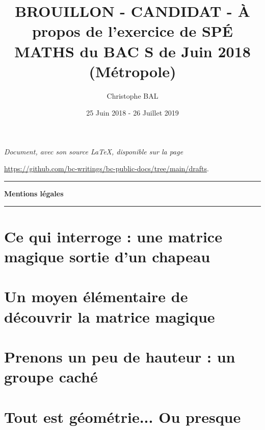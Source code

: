 \documentclass[12pt]{amsart}
\newcommand\squote[1]{\og #1 \fg{}}
\begin{document}
\title{BROUILLON - CANDIDAT - À propos de l'exercice de SPÉ MATHS du BAC S de Juin 2018 (Métropole)}
\author{Christophe BAL}
\date{25 Juin 2018 - 26 Juillet 2019}
\maketitle


\begin{center}
	\itshape
	Document, avec son source \LaTeX, disponible sur la page

	\url{https://github.com/bc-writings/bc-public-docs/tree/main/drafts}.
\end{center}


\bigskip


\begin{center}
	\hrule\vspace{.3em}
	{
		\fontsize{1.35em}{1em}\selectfont
		\textbf{Mentions \og légales \fg}
	}

	\vspace{0.45em}
	\doclicenseThis
	\hrule
\end{center}



\setcounter{tocdepth}{2}
\tableofcontents



\section{Ce qui interroge : une matrice \squote{magique} sortie d'un chapeau}





\section{Un moyen élémentaire de découvrir la matrice \squote{magique}}





\section{Prenons un peu de hauteur : un groupe \squote{caché}}





\section{Tout est géométrie... Ou presque}


\end{document}
